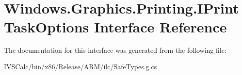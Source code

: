 \hypertarget{interface_windows_1_1_graphics_1_1_printing_1_1_i_print_task_options}{}\section{Windows.\+Graphics.\+Printing.\+I\+Print\+Task\+Options Interface Reference}
\label{interface_windows_1_1_graphics_1_1_printing_1_1_i_print_task_options}


The documentation for this interface was generated from the following file\+:\begin{DoxyCompactItemize}
\item 
I\+V\+S\+Calc/bin/x86/\+Release/\+A\+R\+M/ilc/Safe\+Types.\+g.\+cs\end{DoxyCompactItemize}
